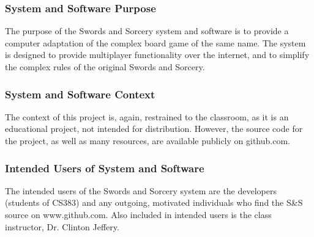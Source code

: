 \documentclass[12pt,a4paper,titlepage]{article}
\begin{document}
\subsubsection{System and Software Purpose}
The purpose of the Swords and Sorcery system and software is to provide a computer adaptation of the complex board game of the same name. The system is designed to provide multiplayer functionality over the internet, and to simplify the complex rules of the original Swords and Sorcery.
\subsubsection{System and Software Context}
The context of this project is, again, restrained to the classroom, as it is an educational project, not intended for distribution. However, the source code for the project, as well as many resources, are available publicly on github.com. 
\subsubsection{Intended Users of System and Software}
The intended users of the Swords and Sorcery system are the developers (students of CS383) and any outgoing, motivated individuals who find the S\&S source on www.github.com. Also included in intended users is the class instructor, Dr. Clinton Jeffery. 
\end{document}
